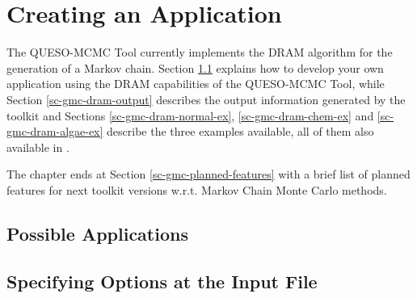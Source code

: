 \chapter{Creating an Application}\label{ch-gmc}
\thispagestyle{headings}

The QUESO-MCMC Tool currently implements the DRAM algorithm \cite{HaLaMiSa06} for the generation of a Markov chain.
Section \ref{sc-gmc-eight-steps} explains how to develop your own application using the DRAM capabilities of the QUESO-MCMC Tool, while
Section \ref{sc-gmc-dram-output} describes the output information generated by the toolkit and
Sections
\ref{sc-gmc-dram-normal-ex},
\ref{sc-gmc-dram-chem-ex} and
\ref{sc-gmc-dram-algae-ex}
describe the three examples available,
all of them also available in \cite{mcmctool}.

The chapter ends at Section \ref{sc-gmc-planned-features} with a brief list of planned features for next toolkit versions w.r.t. Markov Chain Monte Carlo methods.

\section{Possible Applications}\label{sc-gmc-eight-steps}

\section{Specifying Options at the Input File}

